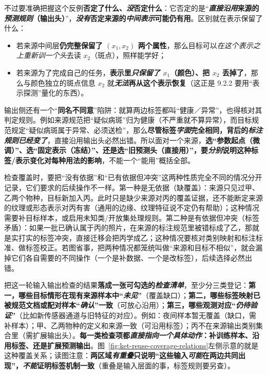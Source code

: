 不过要准确把握这个反例\textbf{否定了什么、\emph{没}否定什么}：它否定的是“\textbf{\emph{直接沿用}来源的\emph{预测规则}（输出头）}”，\textbf{\emph{没有}否定来源的\emph{中间表示}可能仍有用}。区别就在表示保留了什么：
\begin{itemize}\item 若来源中间层\textbf{仍完整保留了 $(x_1,x_2)$ 两个属性}，那么目标可以\emph{在这个表示之上重新训一个头}去读 $x_2$（斑点），照样能学好；\item 若来源为了完成自己的任务，\textbf{表示里\emph{只保留了 $x_1$}（颜色）、把 $x_2$ 丢掉了}，那么与颜色独立的斑点信息 $x_2$ 就\textbf{\emph{无法}再从这个表示恢复}（这正是 9.2.2 要用“表示探测”量化的东西）。\end{itemize}
输出侧还有一个“\textbf{同名不同意}”陷阱：就算两边标签都叫“健康／异常”，也得核对其判定规则。例如来源规范把“疑似病斑”归为健康（不严重就不算异常），而目标规范规定“疑似病斑属于异常、必须送检”，那么\textbf{尽管标签\emph{字面}完全相同，背后的\emph{标注规则已经变了}}，直接沿用输出头必然出错。所以面对一个来源，\textbf{选“参数起点（微调）”、选“固定表示（冻结）”、还是选“旧预测头（直接用）”，要\emph{分别}说明这种标签/表示变化对每种用法的影响}，不能一个“能用”概括全部。

检查覆盖时，要把“没有依据”和“已有依据但冲突”这两种性质完全不同的情况分开记录，它们要求的后续操作不一样。第一种是无依据（缺覆盖）：来源只见过甲、乙两个物种，目标新加入丙。此时只是缺少来源对丙的覆盖证据，还不能断定来源的纹理或形态表示对丙有害（通用的边缘、纹理特征说不定仍有帮助）；这种情况需要补目标样本，或启用未知类/开放集处理规则。第二种是有依据但冲突（标签矛盾）：如果一批已确认属于丙的照片，在来源的标注规范里被错标成了乙，那就是实打实的标签冲突，直接迁移会把丙学成乙；这种情况要核对类别映射和标注标准、做标签校正。若图省事，把两种情况都笼统叫做“来源和目标不相似”，就会漏掉它们各自需要的不同操作（一个是补数据、一个是改标签），后续选择必然出错。

把这一轮输入输出检查的结果\textbf{落成一张可勾选的\emph{检查清单}}，至少分三类登记：\textbf{第一，哪些目标情形在现有来源样本中“\emph{未见}”}（覆盖缺口）；\textbf{第二，哪些标签映射已被规范文档或配对样本“\emph{确认}”一致}（可放心沿用）；\textbf{第三，哪些观测对应“\emph{仍待验证}”}（比如新传感器通道与旧特征的对应）。例如：夜间样本暂无覆盖（缺口，需补样本）；甲、乙两物种的定义和来源一致（可沿用标签）；丙不在来源输出类别集合里（需扩展输出头）。\textbf{每一类检查项都\emph{直接指向一个具体动作}：补训练样本、沿用标签、还是扩展预测输出}。图~\ref{fig:ket-reuse-coverage-relations}左侧示意的就是这种覆盖关系；读图注意：\textbf{两区域\emph{有重叠}只说明“这些输入\emph{可能}在两边共同出现”，\emph{不能}证明标签机制一致}（重叠是输入层面的事，标签规则要另查）。


